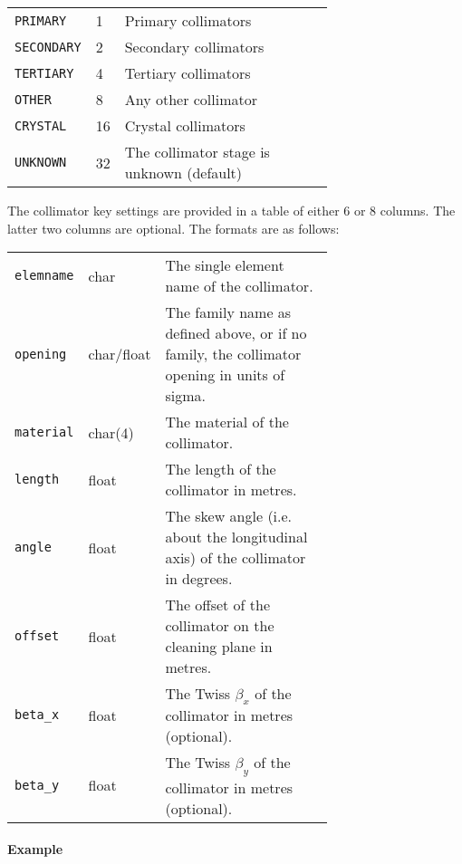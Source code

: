 \bigskip
\begin{tabular}{@{}llp{0.7\linewidth}}
    \texttt{PRIMARY}   &  1 & Primary collimators \\
    \texttt{SECONDARY} &  2 & Secondary collimators \\
    \texttt{TERTIARY}  &  4 & Tertiary collimators \\
    \texttt{OTHER}     &  8 & Any other collimator \\
    \texttt{CRYSTAL}   & 16 & Crystal collimators \\
    \texttt{UNKNOWN}   & 32 & The collimator stage is unknown (default) \\
\end{tabular}

\bigskip
The collimator key settings are provided in a table of either 6 or 8 columns.
The latter two columns are optional.
The formats are as follows:

\bigskip
\begin{tabular}{@{}llp{0.7\linewidth}}
    \texttt{elemname} & char       & The single element name of the collimator. \\
    \texttt{opening}  & char/float & The family name as defined above, or if no family, the collimator opening in units of sigma. \\
    \texttt{material} & char(4)    & The material of the collimator. \\
    \texttt{length}   & float      & The length of the collimator in metres. \\
    \texttt{angle}    & float      & The skew angle (i.e. about the longitudinal axis) of the collimator in degrees. \\
    \texttt{offset}   & float      & The offset of the collimator on the cleaning plane in metres. \\
    \texttt{beta\_x}  & float      & The Twiss $\beta_x$ of the collimator in metres (optional). \\
    \texttt{beta\_y}  & float      & The Twiss $\beta_y$ of the collimator in metres (optional). \\
\end{tabular}

\paragraph{Example}~

